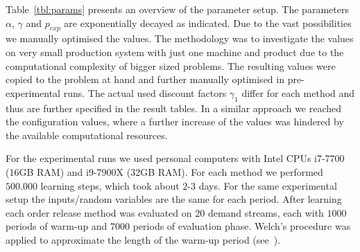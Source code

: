 \documentclass[envcountsame]{llncs}
\begin{document}
%
Table~\ref{tbl:params} presents an overview of the parameter setup. The parameters \(\alpha\),
\(\gamma\) and \(p_{exp}\) are exponentially decayed as indicated. Due to the vast possibilities we
manually optimised the values. The methodology was to investigate the values on very small
production system with just one machine and product due to the computational complexity of bigger
sized problems. The resulting values were copied to the problem at hand and further manually
optimised in pre-experimental runs. The actual used discount factors \(\gamma_{1}\) differ for each
method and thus are further specified in the result tables.
In a similar approach we reached the configuration values, where a further increase of the values
was hindered by the available computational resources.


For the experimental runs we used personal computers with Intel CPUs i7-7700 (16GB RAM) and i9-7900X
(32GB RAM). For each method we performed \(500.000\) learning steps, which took about \(2\)-\(3\)
days. For the same experimental setup the inputs/random variables are the same for each period.
After learning each order release method was evaluated on \(20\) demand streams, each with \(1000\)
periods of warm-up and \(7000\) periods of evaluation phase. Welch’s procedure was applied to
approximate the length of the warm-up period (see~\cite{law:simulationc}).
\end{document}
